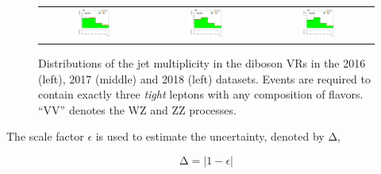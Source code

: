 \begin{figure}[tbh!]
 \begin{center}
 \begin{tabular}{ccc}
 \includegraphics[width=0.325\textwidth]{figures/Part3/Systematics/njet_2016}&
 \includegraphics[width=0.325\textwidth]{figures/Part3/Systematics/njet_2017}&
 \includegraphics[width=0.325\textwidth]{figures/Part3/Systematics/njet_2018}\\
 \end{tabular}
 \caption{Distributions of the jet multiplicity in the diboson \acp{VR} in the 2016 (left), 2017 (middle) and 2018 (left) datasets. Events are required to contain exactly three \emph{tight} leptons with any composition of flavors. ``VV'' denotes the WZ and ZZ processes.}
 \label{fig:VV_CR}
 \end{center}
\end{figure}

The scale factor $\epsilon$ is used to estimate the uncertainty, denoted by $\mathrm{\Delta}$,

\begin{equation}
\mathrm{\Delta}=|1-\epsilon|
\end{equation}


